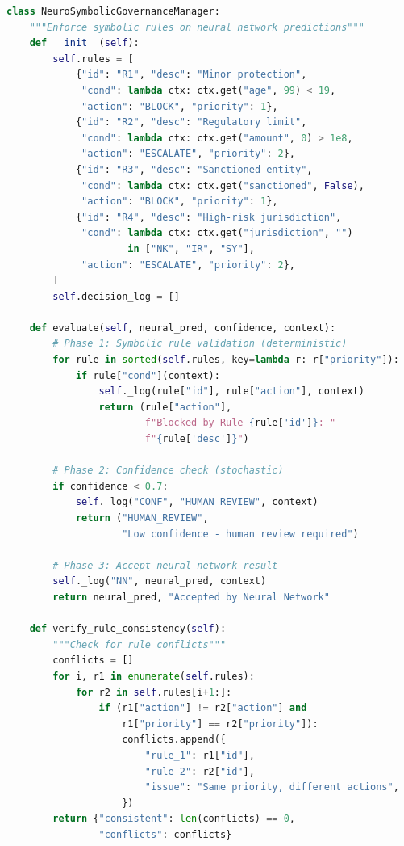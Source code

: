 \begin{lstlisting}[language=Python, caption={뉴로심볼릭 거버넌스 관리자}, label={lst:neuro_sym}]
class NeuroSymbolicGovernanceManager:
    """Enforce symbolic rules on neural network predictions"""
    def __init__(self):
        self.rules = [
            {"id": "R1", "desc": "Minor protection",
             "cond": lambda ctx: ctx.get("age", 99) < 19,
             "action": "BLOCK", "priority": 1},
            {"id": "R2", "desc": "Regulatory limit",
             "cond": lambda ctx: ctx.get("amount", 0) > 1e8,
             "action": "ESCALATE", "priority": 2},
            {"id": "R3", "desc": "Sanctioned entity",
             "cond": lambda ctx: ctx.get("sanctioned", False),
             "action": "BLOCK", "priority": 1},
            {"id": "R4", "desc": "High-risk jurisdiction",
             "cond": lambda ctx: ctx.get("jurisdiction", "")
                     in ["NK", "IR", "SY"],
             "action": "ESCALATE", "priority": 2},
        ]
        self.decision_log = []

    def evaluate(self, neural_pred, confidence, context):
        # Phase 1: Symbolic rule validation (deterministic)
        for rule in sorted(self.rules, key=lambda r: r["priority"]):
            if rule["cond"](context):
                self._log(rule["id"], rule["action"], context)
                return (rule["action"],
                        f"Blocked by Rule {rule['id']}: "
                        f"{rule['desc']}")

        # Phase 2: Confidence check (stochastic)
        if confidence < 0.7:
            self._log("CONF", "HUMAN_REVIEW", context)
            return ("HUMAN_REVIEW",
                    "Low confidence - human review required")

        # Phase 3: Accept neural network result
        self._log("NN", neural_pred, context)
        return neural_pred, "Accepted by Neural Network"

    def verify_rule_consistency(self):
        """Check for rule conflicts"""
        conflicts = []
        for i, r1 in enumerate(self.rules):
            for r2 in self.rules[i+1:]:
                if (r1["action"] != r2["action"] and
                    r1["priority"] == r2["priority"]):
                    conflicts.append({
                        "rule_1": r1["id"],
                        "rule_2": r2["id"],
                        "issue": "Same priority, different actions",
                    })
        return {"consistent": len(conflicts) == 0,
                "conflicts": conflicts}


\end{lstlisting}
